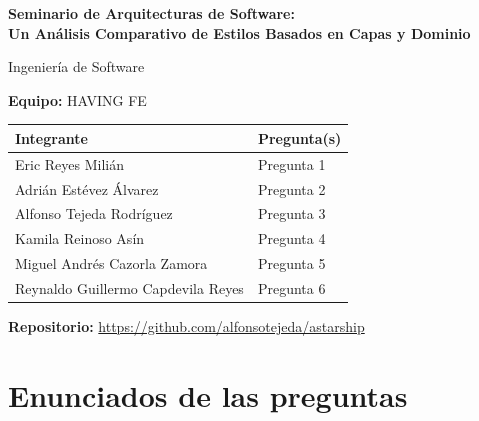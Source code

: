 \documentclass[12pt,a4paper]{article}
\begin{document}
\begin{titlepage}
  \centering
  {\Large \textbf{Seminario de Arquitecturas de Software:\\
  Un Análisis Comparativo de Estilos Basados en Capas y Dominio}\par}
  \vspace{1.5cm}
  {\large Ingeniería de Software\par}
  \vspace{1cm}
  {\large \textbf{Equipo:} HAVING FE\par}
  \vspace{1.5cm}

  \begin{tabular}{p{7cm}p{6cm}}
    \hline
    \textbf{Integrante} & \textbf{Pregunta(s)} \\
    \hline
    Eric Reyes Milián & Pregunta 1 \\
    Adrián Estévez Álvarez & Pregunta 2 \\
    Alfonso Tejeda Rodríguez & Pregunta 3 \\
    Kamila Reinoso Asín & Pregunta 4 \\
    Miguel Andrés Cazorla Zamora & Pregunta 5 \\
    Reynaldo Guillermo Capdevila Reyes & Pregunta 6 \\
    \hline
  \end{tabular}

  \vspace{1.5cm}
  \textbf{Repositorio:} \url{https://github.com/alfonsotejeda/astarship}
\end{titlepage}

\tableofcontents
\newpage
\section*{Enunciados de las preguntas}
\end{document}
